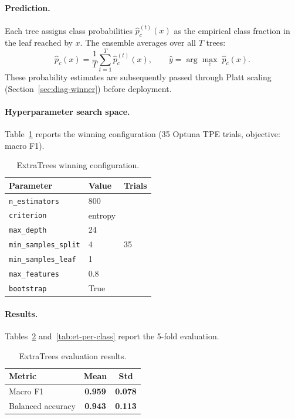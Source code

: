 \paragraph{Prediction.}
Each tree assigns class probabilities $\hat{p}_c^{(t)}(x)$ as the empirical class fraction in the leaf reached by $x$. The ensemble averages over all $T$ trees:
\begin{equation}
    \hat{p}_c(x) = \frac{1}{T}\sum_{t=1}^{T}\hat{p}_c^{(t)}(x), \qquad \hat{y} = \arg\max_{c}\;\hat{p}_c(x).
\end{equation}
These probability estimates are subsequently passed through Platt scaling (Section~\ref{sec:diag-winner}) before deployment.

\paragraph{Hyperparameter search space.}
Table~\ref{tab:et-hpo} reports the winning configuration (35 Optuna TPE trials, objective: macro F1).
\begin{table}[H]
\centering
\caption{ExtraTrees winning configuration.\label{tab:et-hpo}}
\begin{tabular}{lll}
\toprule
\textbf{Parameter} & \textbf{Value} & \textbf{Trials} \\
\midrule
\texttt{n\_estimators}       & 800     & \multirow{7}{*}{35} \\
\texttt{criterion}           & entropy & \\
\texttt{max\_depth}          & 24      & \\
\texttt{min\_samples\_split} & 4       & \\
\texttt{min\_samples\_leaf}  & 1       & \\
\texttt{max\_features}       & 0.8     & \\
\texttt{bootstrap}           & True    & \\
\bottomrule
\end{tabular}
\end{table}

\paragraph{Results.}
Tables~\ref{tab:et-results} and~\ref{tab:et-per-class} report the 5-fold evaluation.
\begin{table}[H]
\centering
\caption{ExtraTrees evaluation results.\label{tab:et-results}}
\begin{tabular}{lcc}
\toprule
\textbf{Metric} & \textbf{Mean} & \textbf{Std} \\
\midrule
Macro F1          & \textbf{0.959} & \textbf{0.078} \\
Balanced accuracy & \textbf{0.943} & \textbf{0.113} \\
\bottomrule
\end{tabular}
\end{table}

